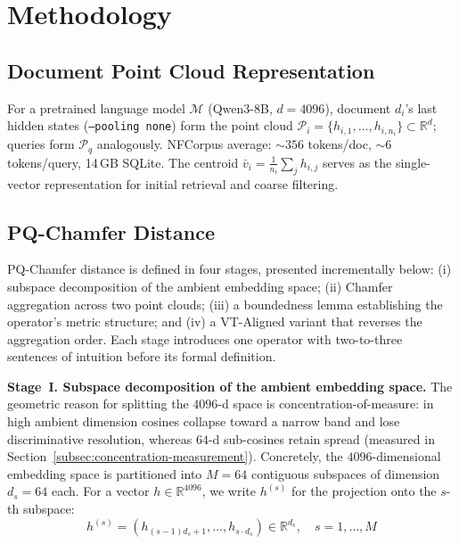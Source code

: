 \documentclass[review,1p]{elsarticle}
\newcommand{\R}{\mathbb{R}}
\newcommand{\bv}{\bar{v}}
\begin{document}
\section{Methodology}
\label{sec:method}

\subsection{Document Point Cloud Representation}
\label{subsec:point-cloud}

For a pretrained language model $\mathcal{M}$ (Qwen3-8B, $d = 4096$), document $d_i$'s last hidden states (\texttt{--pooling none}) form the point cloud $\mathcal{P}_i = \{h_{i,1}, \ldots, h_{i,n_i}\} \subset \R^d$; queries form $\mathcal{P}_q$ analogously. NFCorpus average: ${\sim}356$ tokens/doc, ${\sim}6$ tokens/query, 14\,GB SQLite. The centroid $\bv_i = \tfrac{1}{n_i}\sum_j h_{i,j}$ serves as the single-vector representation for initial retrieval and coarse filtering.

\subsection{PQ-Chamfer Distance}
\label{subsec:pq-chamfer}

PQ-Chamfer distance is defined in four stages, presented incrementally below: (i) subspace decomposition of the ambient embedding space; (ii) Chamfer aggregation across two point clouds; (iii) a boundedness lemma establishing the operator's metric structure; and (iv) a VT-Aligned variant that reverses the aggregation order. Each stage introduces one operator with two-to-three sentences of intuition before its formal definition.

\textbf{Stage~I. Subspace decomposition of the ambient embedding space.} The geometric reason for splitting the $4096$-d space is concentration-of-measure: in high ambient dimension cosines collapse toward a narrow band and lose discriminative resolution, whereas $64$-d sub-cosines retain spread (measured in Section~\ref{subsec:concentration-measurement}). Concretely, the $4096$-dimensional embedding space is partitioned into $M = 64$ contiguous subspaces of dimension $d_s = 64$ each. For a vector $h \in \R^{4096}$, we write $h^{(s)}$ for the projection onto the $s$-th subspace:
\begin{equation}
\label{eq:subspace}
h^{(s)} = (h_{(s-1)d_s+1}, \ldots, h_{s \cdot d_s}) \in \mathbb{R}^{d_s}, \quad s = 1, \ldots, M
\end{equation}
\end{document}

